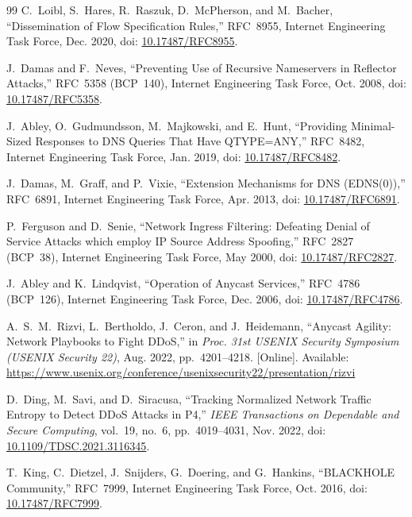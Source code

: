 \documentclass[a4paper,12pt]{article}
\begin{document}
\begin{thebibliography}{99}
C.~Loibl, S.~Hares, R.~Raszuk, D.~McPherson, and M.~Bacher, ``Dissemination of Flow Specification Rules,'' RFC~8955, Internet Engineering Task Force, Dec. 2020, doi: \href{https://doi.org/10.17487/RFC8955}{10.17487/RFC8955}.

J.~Damas and F.~Neves, ``Preventing Use of Recursive Nameservers in Reflector Attacks,'' RFC~5358 (BCP~140), Internet Engineering Task Force, Oct. 2008, doi: \href{https://doi.org/10.17487/RFC5358}{10.17487/RFC5358}.

J.~Abley, O.~Gudmundsson, M.~Majkowski, and E.~Hunt, ``Providing Minimal-Sized Responses to DNS Queries That Have QTYPE=ANY,'' RFC~8482, Internet Engineering Task Force, Jan. 2019, doi: \href{https://doi.org/10.17487/RFC8482}{10.17487/RFC8482}.

J.~Damas, M.~Graff, and P.~Vixie, ``Extension Mechanisms for DNS (EDNS(0)),'' RFC~6891, Internet Engineering Task Force, Apr. 2013, doi: \href{https://doi.org/10.17487/RFC6891}{10.17487/RFC6891}.

P.~Ferguson and D.~Senie, ``Network Ingress Filtering: Defeating Denial of Service Attacks which employ IP Source Address Spoofing,'' RFC~2827 (BCP~38), Internet Engineering Task Force, May 2000, doi: \href{https://doi.org/10.17487/RFC2827}{10.17487/RFC2827}.

J.~Abley and K.~Lindqvist, ``Operation of Anycast Services,'' RFC~4786 (BCP~126), Internet Engineering Task Force, Dec. 2006, doi: \href{https://doi.org/10.17487/RFC4786}{10.17487/RFC4786}.

A.~S.~M.~Rizvi, L.~Bertholdo, J.~Ceron, and J.~Heidemann, ``Anycast Agility: Network Playbooks to Fight DDoS,'' in \textit{Proc. 31st USENIX Security Symposium (USENIX Security 22)}, Aug. 2022, pp.~4201--4218. [Online]. Available: \url{https://www.usenix.org/conference/usenixsecurity22/presentation/rizvi}

D.~Ding, M.~Savi, and D.~Siracusa, ``Tracking Normalized Network Traffic Entropy to Detect DDoS Attacks in P4,'' \textit{IEEE Transactions on Dependable and Secure Computing}, vol.~19, no.~6, pp.~4019--4031, Nov. 2022, doi: \href{https://doi.org/10.1109/TDSC.2021.3116345}{10.1109/TDSC.2021.3116345}.

T.~King, C.~Dietzel, J.~Snijders, G.~Doering, and G.~Hankins, ``BLACKHOLE Community,'' RFC~7999, Internet Engineering Task Force, Oct. 2016, doi: \href{https://doi.org/10.17487/RFC7999}{10.17487/RFC7999}.


\end{thebibliography}
\end{document}
